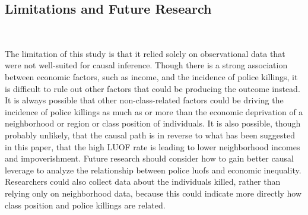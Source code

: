 \documentclass[12pt]{article}
\begin{document}
\subsection{Limitations and Future Research} \

The limitation of this study is that it relied solely on observational data that were not well-suited for causal inference. Though there is a strong association between economic factors, such as income, and the incidence of police killings, it is difficult to rule out other factors that could be producing the outcome instead. It is always possible that other non-class-related factors could be driving the incidence of police killings as much as or more than the economic deprivation of a neighborhood or region or class position of individuals. It is also possible, though probably unlikely, that the causal path is in reverse to what has been suggested in this paper, that the high LUOF rate is leading to lower neighborhood incomes and impoverishment. Future research should consider how to gain better causal leverage to analyze the relationship between police \acrshort{luof}s and economic inequality. Researchers could also collect data about the individuals killed, rather than relying only on neighborhood data, because this could indicate more directly how class position and police killings are related.



\clearpage
\sloppy


\titleformat{\section}{\fontsize{12}{14}\bfseries\centering}{\thesection}{0.5em}{}
\printbibliography[heading=bibintoc]
\end{document}
